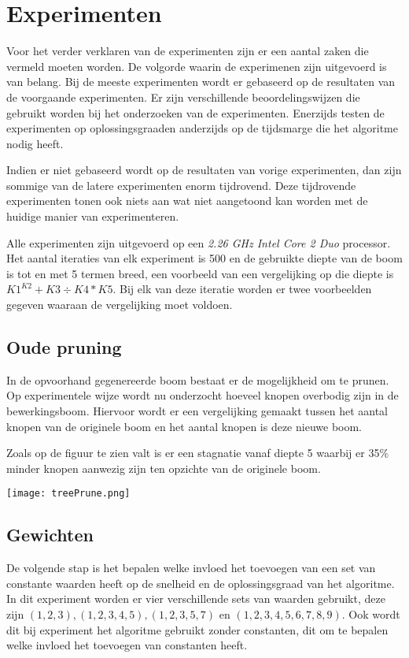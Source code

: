 \documentclass[Main.tex]{subfiles}
\begin{document}
\section{Experimenten}
Voor het verder verklaren van de experimenten zijn er een aantal zaken die vermeld moeten worden. De volgorde waarin de experimenen zijn uitgevoerd is van belang. Bij de meeste experimenten wordt er gebaseerd op de resultaten van de voorgaande experimenten. Er zijn verschillende beoordelingswijzen die gebruikt worden bij het onderzoeken van de experimenten. Enerzijds testen de experimenten op oplossingsgraad\footnotemark[\ref{note:oplossingsgraad}] en anderzijds op de tijdsmarge die het algoritme nodig heeft. 
\par
Indien er niet gebaseerd wordt op de resultaten van vorige experimenten, dan zijn sommige van de latere experimenten enorm tijdrovend. Deze tijdrovende experimenten tonen ook niets aan wat niet aangetoond kan worden met de huidige manier van experimenteren.
\par
Alle experimenten zijn uitgevoerd op een \textit{2.26 GHz Intel Core 2 Duo} processor. Het aantal iteraties van elk experiment is 500 en de gebruikte diepte van de boom is tot en met 5 termen breed, een voorbeeld van een vergelijking op die diepte is $K1^{K2}+K3 \div K4*K5$. Bij elk van deze iteratie worden er twee voorbeelden gegeven waaraan de vergelijking moet voldoen.

\subsection{Oude pruning}

In de opvoorhand gegenereerde boom bestaat er de mogelijkheid om te prunen. Op experimentele wijze wordt nu onderzocht hoeveel knopen overbodig zijn in de bewerkingsboom. Hiervoor wordt er een vergelijking gemaakt tussen het aantal knopen van de originele boom en het aantal knopen is deze nieuwe boom.
\par Zoals op de figuur te zien valt is er een stagnatie vanaf diepte 5 waarbij er 35\% minder knopen aanwezig zijn ten opzichte van de originele boom. 
\begin{center}
\texttt{[image: treePrune.png]}
\end{center}

\subsection{Gewichten}
De volgende stap is het bepalen welke invloed het toevoegen van een set van constante waarden heeft op de snelheid en de oplossingsgraad van het algoritme. In dit experiment worden er vier verschillende sets van waarden gebruikt, deze zijn $(1,2,3), (1,2,3,4,5), (1,2,3,5,7)$ en $(1,2,3,4,5,6,7,8,9)$. Ook wordt dit bij experiment het algoritme gebruikt zonder constanten, dit om te bepalen welke invloed het toevoegen van constanten heeft.
\end{document}
